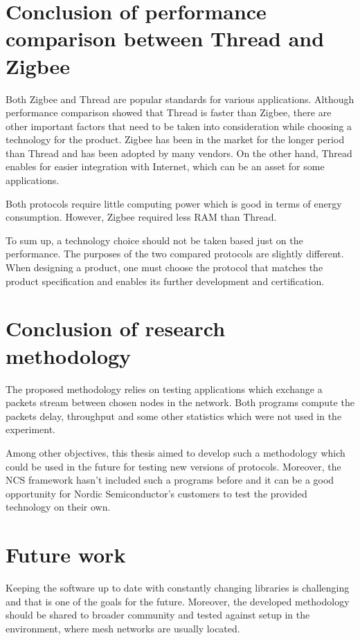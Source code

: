 
\section{Conclusion of performance comparison between Thread and Zigbee}

Both Zigbee and Thread are popular standards for various applications.
Although performance comparison showed that Thread is faster than Zigbee,
there are other important factors that need to be taken into consideration
while choosing a technology for the product. Zigbee has been in the 
market for the longer period than Thread and has been adopted by many
vendors. On the other hand, Thread enables for easier integration
with Internet, which can be an asset for some applications.

Both protocols require little computing power which is good in terms
of energy consumption. However, Zigbee required less RAM than Thread.

To sum up, a technology choice should not be taken based just on
the performance. The purposes of the two compared protocols are slightly
different. When designing a product, one must choose the protocol that
matches the product specification and enables its further development and
certification.

\section{Conclusion of research methodology}

The proposed methodology relies on testing applications which exchange
a packets stream between chosen nodes in the network. Both programs
compute the packets delay, throughput and some other statistics which
were not used in the experiment.

Among other objectives, this thesis aimed to develop such a methodology
which could be used in the future for testing new versions of protocols.
Moreover, the NCS framework hasn't included such a programs before and 
it can be a good opportunity for Nordic Semiconductor's customers to
test the provided technology on their own.

\section{Future work}

Keeping
the software up to date with constantly changing libraries is
challenging and that is one of the goals for the future. Moreover,
the developed methodology should be shared to broader community
and tested against setup in the environment, where mesh networks
are usually located.
